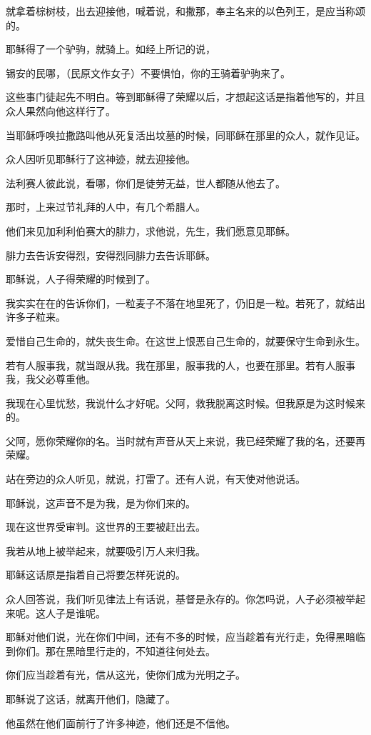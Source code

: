 \documentclass[12pt,oneside]{book}
\begin{document}
就拿着棕树枝，出去迎接他，喊着说，和撒那，奉主名来的以色列王，是应当称颂的。

耶稣得了一个驴驹，就骑上。如经上所记的说，

锡安的民哪，（民原文作女子）不要惧怕，你的王骑着驴驹来了。

这些事门徒起先不明白。等到耶稣得了荣耀以后，才想起这话是指着他写的，并且众人果然向他这样行了。

当耶稣呼唤拉撒路叫他从死复活出坟墓的时候，同耶稣在那里的众人，就作见证。

众人因听见耶稣行了这神迹，就去迎接他。

法利赛人彼此说，看哪，你们是徒劳无益，世人都随从他去了。

那时，上来过节礼拜的人中，有几个希腊人。

他们来见加利利伯赛大的腓力，求他说，先生，我们愿意见耶稣。

腓力去告诉安得烈，安得烈同腓力去告诉耶稣。

耶稣说，人子得荣耀的时候到了。

我实实在在的告诉你们，一粒麦子不落在地里死了，仍旧是一粒。若死了，就结出许多子粒来。

爱惜自己生命的，就失丧生命。在这世上恨恶自己生命的，就要保守生命到永生。

若有人服事我，就当跟从我。我在那里，服事我的人，也要在那里。若有人服事我，我父必尊重他。

我现在心里忧愁，我说什么才好呢。父阿，救我脱离这时候。但我原是为这时候来的。

父阿，愿你荣耀你的名。当时就有声音从天上来说，我已经荣耀了我的名，还要再荣耀。

站在旁边的众人听见，就说，打雷了。还有人说，有天使对他说话。

耶稣说，这声音不是为我，是为你们来的。

现在这世界受审判。这世界的王要被赶出去。

我若从地上被举起来，就要吸引万人来归我。

耶稣这话原是指着自己将要怎样死说的。

众人回答说，我们听见律法上有话说，基督是永存的。你怎吗说，人子必须被举起来呢。这人子是谁呢。

耶稣对他们说，光在你们中间，还有不多的时候，应当趁着有光行走，免得黑暗临到你们。那在黑暗里行走的，不知道往何处去。

你们应当趁着有光，信从这光，使你们成为光明之子。

耶稣说了这话，就离开他们，隐藏了。

他虽然在他们面前行了许多神迹，他们还是不信他。
\end{document}
